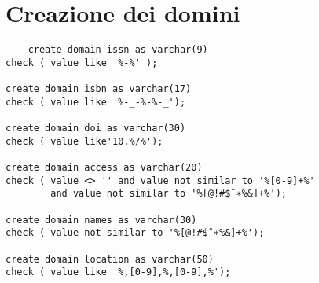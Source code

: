 \section{Creazione dei domini}
\begin{lstlisting}
	create domain issn as varchar(9)
check ( value like '%-%' );

create domain isbn as varchar(17)
check ( value like '%-_-%-%-_');

create domain doi as varchar(30)
check ( value like'10.%/%');

create domain access as varchar(20)
check ( value <> '' and value not similar to '%[0-9]+%'
        and value not similar to '%[@!#$ˆ∗%&]+%');

create domain names as varchar(30)
check ( value not similar to '%[@!#$ˆ∗%&]+%');

create domain location as varchar(50)
check ( value like '%,[0-9],%,[0-9],%');
\end{lstlisting}

